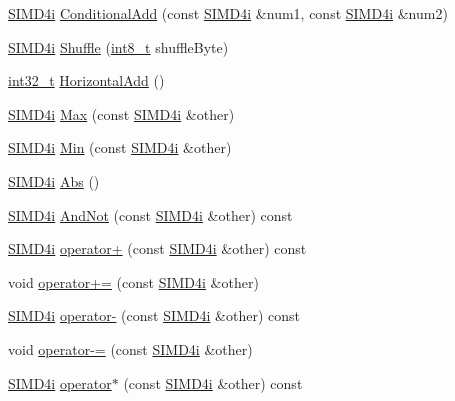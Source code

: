 \begin{DoxyCompactItemize}
\item 
\hyperlink{class_s_i_m_d4i}{S\+I\+M\+D4i} \hyperlink{class_s_i_m_d4i_a62d3294324d4a18391edc89237dba7e8}{Conditional\+Add} (const \hyperlink{class_s_i_m_d4i}{S\+I\+M\+D4i} \&num1, const \hyperlink{class_s_i_m_d4i}{S\+I\+M\+D4i} \&num2)
\item 
\hyperlink{class_s_i_m_d4i}{S\+I\+M\+D4i} \hyperlink{class_s_i_m_d4i_abffef0eeb3a187e0ce3c0758f50ed34b}{Shuffle} (\hyperlink{simddefines_8h_aef44329758059c91c76d334e8fc09700}{int8\+\_\+t} shuffle\+Byte)
\item 
\hyperlink{simddefines_8h_ab1967d8591af1a4e48c37fd2b0f184d0}{int32\+\_\+t} \hyperlink{class_s_i_m_d4i_a91c7784a2928c70413ea2138d3cc2e60}{Horizontal\+Add} ()
\item 
\hyperlink{class_s_i_m_d4i}{S\+I\+M\+D4i} \hyperlink{class_s_i_m_d4i_a5dead3fb2787d20ed2ede5fcb87546d2}{Max} (const \hyperlink{class_s_i_m_d4i}{S\+I\+M\+D4i} \&other)
\item 
\hyperlink{class_s_i_m_d4i}{S\+I\+M\+D4i} \hyperlink{class_s_i_m_d4i_aaa3c6d22f98c3f2fcb9f22a562a70f8e}{Min} (const \hyperlink{class_s_i_m_d4i}{S\+I\+M\+D4i} \&other)
\item 
\hyperlink{class_s_i_m_d4i}{S\+I\+M\+D4i} \hyperlink{class_s_i_m_d4i_a1a0afd69d518d97eb5b4e4dd111e9de1}{Abs} ()
\item 
\hyperlink{class_s_i_m_d4i}{S\+I\+M\+D4i} \hyperlink{class_s_i_m_d4i_a0f1acd42f98dec47823cd81745bfc19d}{And\+Not} (const \hyperlink{class_s_i_m_d4i}{S\+I\+M\+D4i} \&other) const 
\item 
\hyperlink{class_s_i_m_d4i}{S\+I\+M\+D4i} \hyperlink{class_s_i_m_d4i_a3aef1f1536aa90880c303ea416289fb2}{operator+} (const \hyperlink{class_s_i_m_d4i}{S\+I\+M\+D4i} \&other) const 
\item 
void \hyperlink{class_s_i_m_d4i_a3321916006dbe9e44e59ddad40d3dd6c}{operator+=} (const \hyperlink{class_s_i_m_d4i}{S\+I\+M\+D4i} \&other)
\item 
\hyperlink{class_s_i_m_d4i}{S\+I\+M\+D4i} \hyperlink{class_s_i_m_d4i_a1c9112942d58194cd619ba474187b2d5}{operator-\/} (const \hyperlink{class_s_i_m_d4i}{S\+I\+M\+D4i} \&other) const 
\item 
void \hyperlink{class_s_i_m_d4i_a65a7fa9a69b0c918a73246c0d70acad5}{operator-\/=} (const \hyperlink{class_s_i_m_d4i}{S\+I\+M\+D4i} \&other)
\item 
\hyperlink{class_s_i_m_d4i}{S\+I\+M\+D4i} \hyperlink{class_s_i_m_d4i_adb18fff517c987f0d33aa7f0de198dc0}{operator$\ast$} (const \hyperlink{class_s_i_m_d4i}{S\+I\+M\+D4i} \&other) const 

\end{DoxyCompactItemize}
